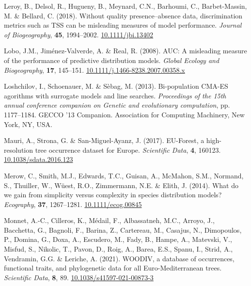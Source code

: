 \documentclass[11pt,]{article}
\newlength{\cslhangindent}
\newenvironment{CSLReferences}[2] %
 {%
  \setlength{\parindent}{0pt}
  \ifodd #1 \everypar{\setlength{\hangindent}{\cslhangindent}}\ignorespaces\fi
  \ifnum #2 > 0
  \setlength{\parskip}{#2\baselineskip}
  \fi
 }%
 {}
\begin{document}
\begin{CSLReferences}{1}{0}
\leavevmode{}%
Leroy, B., Delsol, R., Hugueny, B., Meynard, C.N., Barhoumi, C.,
Barbet-Massin, M. \& Bellard, C. (2018). Without quality
presence--absence data, discrimination metrics such as {TSS} can be
misleading measures of model performance. \emph{Journal of
Biogeography}, \textbf{45}, 1994--2002.
\href{https://doi.org/10.1111/jbi.13402}{10.1111/jbi.13402}

\leavevmode{}%
Lobo, J.M., Jiménez-Valverde, A. \& Real, R. (2008). {AUC}: A misleading
measure of the performance of predictive distribution models.
\emph{Global Ecology and Biogeography}, \textbf{17}, 145--151.
\href{https://doi.org/10.1111/j.1466-8238.2007.00358.x}{10.1111/j.1466-8238.2007.00358.x}

\leavevmode{}%
Loshchilov, I., Schoenauer, M. \& Sèbag, M. (2013). Bi-population
{CMA}-{ES} agorithms with surrogate models and line searches.
\emph{Proceedings of the 15th annual conference companion on {Genetic}
and evolutionary computation}, pp. 1177--1184. {GECCO} '13 {Companion}.
Association for Computing Machinery, New York, NY, USA.

\leavevmode{}%
Mauri, A., Strona, G. \& San-Miguel-Ayanz, J. (2017). {EU}-{Forest}, a
high-resolution tree occurrence dataset for {Europe}. \emph{Scientific
Data}, \textbf{4}, 160123.
\href{https://doi.org/10.1038/sdata.2016.123}{10.1038/sdata.2016.123}

\leavevmode{}%
Merow, C., Smith, M.J., Edwards, T.C., Guisan, A., McMahon, S.M.,
Normand, S., Thuiller, W., Wüest, R.O., Zimmermann, N.E. \& Elith, J.
(2014). What do we gain from simplicity versus complexity in species
distribution models? \emph{Ecography}, \textbf{37}, 1267--1281.
\href{https://doi.org/10.1111/ecog.00845}{10.1111/ecog.00845}

\leavevmode{}%
Monnet, A.-C., Cilleros, K., Médail, F., Albassatneh, M.C., Arroyo, J.,
Bacchetta, G., Bagnoli, F., Barina, Z., Cartereau, M., Casajus, N.,
Dimopoulos, P., Domina, G., Doxa, A., Escudero, M., Fady, B., Hampe, A.,
Matevski, V., Misfud, S., Nikolic, T., Pavon, D., Roig, A., Barea, E.S.,
Spanu, I., Strid, A., Vendramin, G.G. \& Leriche, A. (2021). {WOODIV}, a
database of occurrences, functional traits, and phylogenetic data for
all {Euro}-{Mediterranean} trees. \emph{Scientific Data}, \textbf{8},
89.
\href{https://doi.org/10.1038/s41597-021-00873-3}{10.1038/s41597-021-00873-3}


\end{CSLReferences}
\end{document}
